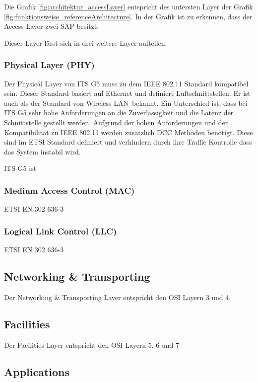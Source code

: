 Die Grafik \ref{fig:architektur_accessLayer} entspricht des untersten Layer der Grafik \ref{fig:funktionsweise_referenceArchitecture}. In der Grafik ist zu erkennen, dass der Access Layer zwei \ac{SAP} besitzt.




Dieser Layer lässt sich in drei weitere Layer aufteilen:

\subsubsection{Physical Layer (PHY)}
Der Physical Layer von ITS G5 muss zu dem IEEE 802.11 Standard kompatibel sein. Dieser Standard basiert auf Ethernet und definiert Luftschnittstellen. Er ist auch als der Standard von \glqq Wireless LAN\grqq~bekannt. Ein Unterschied ist, dass bei ITS G5 sehr hohe Anforderungen an die Zuverlässigkeit und die Latenz der Schnittstelle gestellt werden. Aufgrund der hohen Anforderungen und der Kompatibilität zu IEEE 802.11 werden zusätzlich \ac{DCC} Methoden benötigt. Diese sind im ETSI Standard \cite{etsi102687} definiert und verhindern durch ihre Traffic Kontrolle dass das System instabil wird.

ITS G5 ist 

\subsubsection{Medium Access Control (MAC)}
ETSI EN 302 636-3
\subsubsection{Logical Link Control (LLC)}
ETSI EN 302 636-3


\subsection{Networking \& Transporting \label{architektur_networkingTransporting}}
Der Networking \& Transporting Layer entspricht den \ac{OSI} Layern 3 und 4.


\subsection{Facilities}
Der Facilities Layer entspricht den \ac{OSI} Layern 5, 6 und 7

\subsection{Applications}


